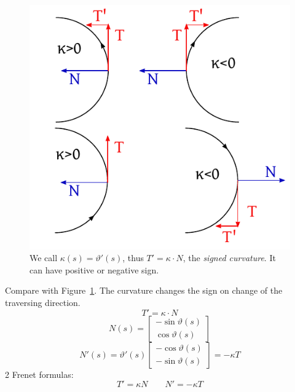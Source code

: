\documentclass{article}
\begin{document}
\begin{figure}[p]
  \begin{center}
    \includegraphics{img/56_signed_curvature.pdf}
    \caption{
      We call $\kappa(s) = \vartheta'(s)$, thus $T' = \kappa \cdot N$, the \emph{signed curvature}. It can have positive or negative sign.
    }
    \label{img:signed-curvature}
  \end{center}
\end{figure}

Compare with Figure~\ref{img:signed-curvature}.
The curvature changes the sign on change of the traversing direction.
\[ T' = \kappa \cdot N \]
\[ N(s) = \begin{bmatrix} -\sin{\vartheta(s)} \\ \cos{\vartheta(s)} \end{bmatrix} \]
\[ N'(s) = \vartheta'(s) \begin{bmatrix} -\cos\vartheta(s) \\ -\sin\vartheta(s) \end{bmatrix} = -\kappa T \]
2 Frenet formulas:
\[ T' = \kappa N \qquad N' = -\kappa T \]
\end{document}
